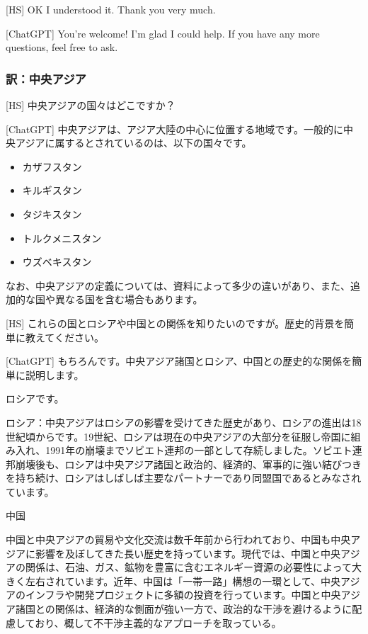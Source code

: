 \documentclass[
]{bxjsbook}
\providecommand{\tightlist}{%
  \setlength{\itemsep}{0pt}\setlength{\parskip}{0pt}}
\theoremstyle{definition}
\theoremstyle{definition}
\theoremstyle{definition}
\theoremstyle{definition}
\theoremstyle{remark}
\begin{document}
{[}HS{]} OK I understood it. Thank you very much.

{[}ChatGPT{]} You're welcome! I'm glad I could help. If you have any more questions, feel free to ask.

\hypertarget{centralasiaj}{%
\subsubsection{訳：中央アジア}\label{centralasiaj}}

{[}HS{]} 中央アジアの国々はどこですか？

{[}ChatGPT{]} 中央アジアは、アジア大陸の中心に位置する地域です。一般的に中央アジアに属するとされているのは、以下の国々です。

\begin{itemize}
\tightlist
\item
  カザフスタン
\item
  キルギスタン
\item
  タジキスタン
\item
  トルクメニスタン
\item
  ウズベキスタン
\end{itemize}

なお、中央アジアの定義については、資料によって多少の違いがあり、また、追加的な国や異なる国を含む場合もあります。

{[}HS{]} これらの国とロシアや中国との関係を知りたいのですが。歴史的背景を簡単に教えてください。

{[}ChatGPT{]} もちろんです。中央アジア諸国とロシア、中国との歴史的な関係を簡単に説明します。

ロシアです。

ロシア：中央アジアはロシアの影響を受けてきた歴史があり、ロシアの進出は18世紀頃からです。19世紀、ロシアは現在の中央アジアの大部分を征服し帝国に組み入れ、1991年の崩壊までソビエト連邦の一部として存続しました。ソビエト連邦崩壊後も、ロシアは中央アジア諸国と政治的、経済的、軍事的に強い結びつきを持ち続け、ロシアはしばしば主要なパートナーであり同盟国であるとみなされています。

中国

中国と中央アジアの貿易や文化交流は数千年前から行われており、中国も中央アジアに影響を及ぼしてきた長い歴史を持っています。現代では、中国と中央アジアの関係は、石油、ガス、鉱物を豊富に含むエネルギー資源の必要性によって大きく左右されています。近年、中国は「一帯一路」構想の一環として、中央アジアのインフラや開発プロジェクトに多額の投資を行っています。中国と中央アジア諸国との関係は、経済的な側面が強い一方で、政治的な干渉を避けるように配慮しており、概して不干渉主義的なアプローチを取っている。
\end{document}

